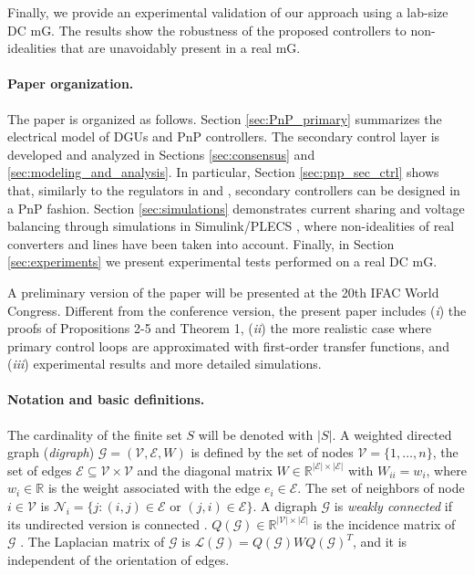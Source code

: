 \documentclass[a4paper]{article}
\theoremstyle{plain}
\begin{document}
	Finally, we provide an experimental validation of our approach using a lab-size DC mG. The results show the robustness of the proposed controllers to non-idealities that are unavoidably present in a real mG.

\paragraph{Paper organization.}	
The paper is organized as
follows. Section \ref{sec:PnP_primary} summarizes the electrical model
of DGUs and PnP controllers. The secondary control layer is developed
and analyzed in Sections \ref{sec:consensus} and
\ref{sec:modeling_and_analysis}. In particular, Section \ref{sec:pnp_sec_ctrl} shows that, similarly to the regulators in \cite{tucci2015decentralized} and \cite{tucci2016improved}, secondary controllers can be designed in a PnP fashion. Section \ref{sec:simulations} demonstrates current
sharing and voltage balancing through simulations in Simulink/PLECS
\cite{allmeling2013plecs}, where non-idealities of real converters
and lines have been taken into account. Finally, in Section \ref{sec:experiments} we present experimental tests performed on a real DC mG.

A preliminary version of the paper will be presented at the 20th IFAC World Congress. Different from the conference version, the present paper includes (\textit{i}) the proofs of Propositions 2-5 and Theorem 1, (\textit{ii}) the more realistic case where primary control loops are approximated with first-order transfer functions, and (\textit{iii}) experimental results and more detailed simulations.

\paragraph{Notation and basic definitions.} 
The cardinality of the finite set $S$ will be denoted with $|S|$. A
weighted directed graph (\emph{digraph}) $\mathcal G = (\mathcal V, \mathcal E, W)$ is
defined by the set of nodes $\mathcal{V}=\{1,\dots, n\}$, the set of edges
$\mathcal E \subseteq  \mathcal V \times \mathcal V$ and the diagonal
matrix $W\in\mathbb{R}^{|\mathcal{E}|\times|\mathcal{E}|}$ with $W_{ii}
=w_i$, where $w_i\in\mathbb{R}$ is the weight associated with the edge $e_i\in\mathcal{E}$. The set of neighbors of node $i\in\mathcal{V}$ is $\mathcal{N}_i
=\{j:(i,j)\in\mathcal{E}\text{ or } (j,i) \in
\mathcal{E}\}$. A digraph $\mathcal{G}$ is \textit{weakly connected} if its undirected
version is connected \cite{lns-v.85}. $Q(\mathcal{G})\in\mathbb{R}^{|\mathcal{V}|\times|\mathcal{E}|}$ is the incidence matrix of $\mathcal{G}$
\cite{grone1990laplacian}. The Laplacian matrix of $\mathcal{G}$ is $\mathcal
L(\mathcal{G}) = Q(\mathcal{G})WQ(\mathcal{G})^T$, and it is independent of the orientation of edges. 
\end{document}
